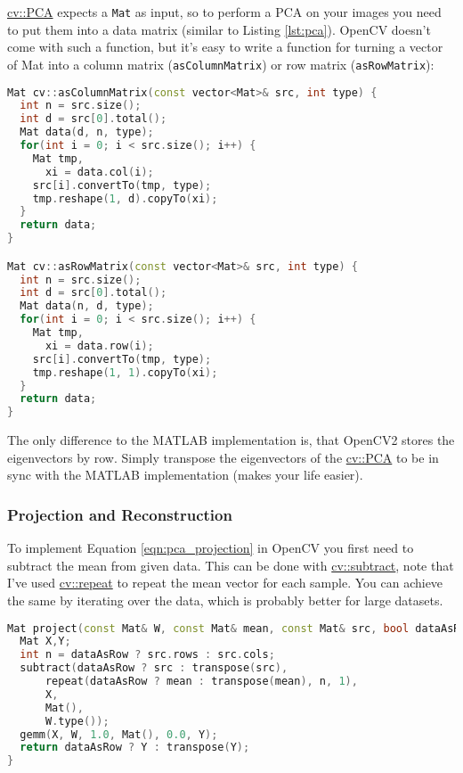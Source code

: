 \href{http://opencv.willowgarage.com/documentation/cpp/operations_on_arrays.html#pca}{cv::PCA} expects a \lstinline|Mat| as input, so to perform a PCA on your images you need to put them into a data matrix (similar to Listing \ref{lst:pca}). OpenCV doesn't come with such a function, but it's easy to write a function for turning a vector of Mat into a column matrix (\lstinline|asColumnMatrix|) or row matrix (\lstinline|asRowMatrix|):

\begin{lstlisting}[language=c++]
Mat cv::asColumnMatrix(const vector<Mat>& src, int type) {
  int n = src.size();
  int d = src[0].total();
  Mat data(d, n, type);
  for(int i = 0; i < src.size(); i++) {
    Mat tmp,
      xi = data.col(i);
    src[i].convertTo(tmp, type);
    tmp.reshape(1, d).copyTo(xi);
  }
  return data;
}

Mat cv::asRowMatrix(const vector<Mat>& src, int type) {
  int n = src.size();
  int d = src[0].total();
  Mat data(n, d, type);
  for(int i = 0; i < src.size(); i++) {
    Mat tmp,
      xi = data.row(i);
    src[i].convertTo(tmp, type);
    tmp.reshape(1, 1).copyTo(xi);
  }
  return data;
}
\end{lstlisting}

The only difference to the MATLAB implementation is, that OpenCV2 stores the eigenvectors by row. Simply transpose the eigenvectors of the \href{http://opencv.willowgarage.com/documentation/cpp/operations_on_arrays.html#pca}{cv::PCA} to be in sync with the MATLAB implementation (makes your life easier).

\subsubsection{Projection and Reconstruction}

To implement Equation \ref{eqn:pca_projection} in OpenCV you first need to subtract the mean from given data. This can be done with \href{http://opencv.willowgarage.com/documentation/cpp/core_operations_on_arrays.html#cv-subtract}{cv::subtract}, note that I've used \href{http://opencv.willowgarage.com/documentation/cpp/core_operations_on_arrays.html#cv-repeat}{cv::repeat} to repeat the mean vector for each sample. You can achieve the same by iterating over the data, which is probably better for large datasets.

\begin{lstlisting}[language=c++,caption={\lstinline|project| projects a given image into the PCA subspace. \label{lst:opencv_projection}}]
Mat project(const Mat& W, const Mat& mean, const Mat& src, bool dataAsRow) {
  Mat X,Y;
  int n = dataAsRow ? src.rows : src.cols;
  subtract(dataAsRow ? src : transpose(src),
      repeat(dataAsRow ? mean : transpose(mean), n, 1),
      X,
      Mat(),
      W.type());
  gemm(X, W, 1.0, Mat(), 0.0, Y);
  return dataAsRow ? Y : transpose(Y);
}
\end{lstlisting}

